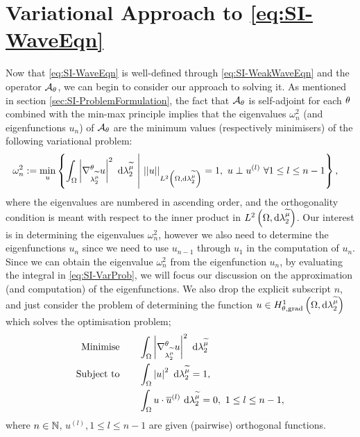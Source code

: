 \section{Variational Approach to \eqref{eq:SI-WaveEqn}} \label{sec:SI-VarProbMethod}
Now that \eqref{eq:SI-WaveEqn} is well-defined through \eqref{eq:SI-WeakWaveEqn} and the operator $\mathcal{A}_{\theta}$, we can begin to consider our approach to solving it.
As mentioned in section \ref{sec:SI-ProblemFormulation}, the fact that $\mathcal{A}_{\theta}$ is self-adjoint for each $\theta$ combined with the min-max principle implies that the eigenvalues $\omega_{n}^2$ (and eigenfunctions $u_n$) of $\mathcal{A}_{\theta}$ are the minimum values (respectively minimisers) of the following variational problem:
\begin{align} \label{eq:SI-VarProb}
	\omega_n^2 &:= \min_{u}\left\{  \int_{\Omega} \left\lvert \nabla^{\theta}_{\lambda_2^{\widetilde{\mu}}}u \right\rvert^2  \ \mathrm{d}\lambda_2^{\widetilde{\mu}} \ \middle\vert \  \lvert\lvert u \rvert\rvert_{L^{2}\left( \Omega,\mathrm{d} \lambda_2^{\widetilde{\mu}} \right)}=1, \ u\perp u^{(l)} \ \forall 1\leq l\leq n-1  \right\},
\end{align} 
where the eigenvalues are numbered in ascending order, and the orthogonality condition is meant with respect to the inner product in $L^{2}\left( \Omega,\mathrm{d} \lambda_2^{\widetilde{\mu}} \right)$.
Our interest is in determining the eigenvalues $\omega_n^2$, however we also need to determine the eigenfunctions $u_n$ since we need to use $u_{n-1}$ through $u_1$ in the computation of $u_{n}$.
Since we can obtain the eigenvalue $\omega_n^2$ from the eigenfunction $u_n$, by evaluating the integral in \eqref{eq:SI-VarProb}, we will focus our discussion on the approximation (and computation) of the eigenfunctions.
We also drop the explicit subscript $n$, and just consider the problem of determining the function $u\in H^1_{\theta, \mathrm{grad}}\left( \Omega, \mathrm{d}\lambda_2^{\widetilde{\mu}} \right)$ which solves the optimisation problem;
\begin{subequations} \label{eq:SI-MinProblem}
	\begin{align}
		\text{Minimise} \quad & \quad \int_{\Omega} \left\lvert \nabla^{\theta}_{\lambda_2^{\widetilde{\mu}}}u \right\rvert^2  \ \mathrm{d}\lambda_2^{\widetilde{\mu}} \\
		\text{Subject to} \quad & \quad \int_{\Omega} \left\lvert u \right\rvert^2  \ \mathrm{d}\lambda_2^{\widetilde{\mu}} = 1, \\
		& \quad \int_{\Omega} u\cdot\overline{u}^{(l)}  \ \mathrm{d}\lambda_2^{\widetilde{\mu}} = 0, \ 1\leq l\leq n-1,
	\end{align}
\end{subequations}
where $n\in\mathbb{N}$, $u^{(l)}, 1\leq l\leq n-1$ are given (pairwise) orthogonal functions.

